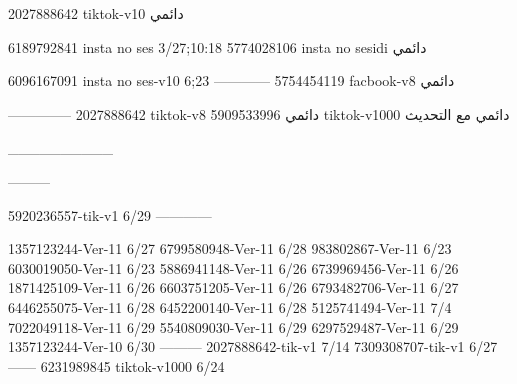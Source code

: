 2027888642 tiktok-v10
دائمي

6189792841 insta no ses
3/27;10:18
5774028106 insta no sesidi
دائمي

6096167091 insta no ses-v10
6;23
------------
5754454119 facbook-v8
دائمي


--------------
2027888642 tiktok-v8
دائمي
5909533996 tiktok-v1000
دائمي مع التحديث

__________

---------

5920236557-tik-v1
6/29
------------

1357123244-Ver-11
6/27
6799580948-Ver-11
6/28
983802867-Ver-11
6/23
6030019050-Ver-11
6/23
5886941148-Ver-11
6/26
6739969456-Ver-11
6/26
1871425109-Ver-11
6/26
6603751205-Ver-11
6/26
6793482706-Ver-11
6/27
6446255075-Ver-11
6/28
6452200140-Ver-11
6/28
5125741494-Ver-11
7/4
7022049118-Ver-11
6/29
5540809030-Ver-11
6/29
6297529487-Ver-11
6/29
1357123244-Ver-10
6/30
---------
2027888642-tik-v1
7/14
7309308707-tik-v1
6/27
------
6231989845 tiktok-v1000
6/24
